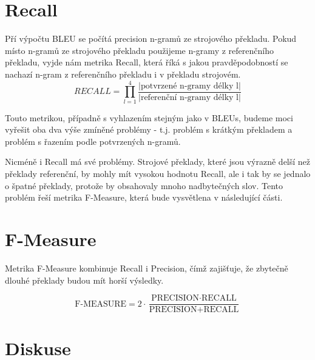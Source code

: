 \section{Recall}
Pří výpočtu BLEU se počítá precision n-gramů ze strojového překladu.
Pokud místo n-gramů ze strojového překladu použijeme n-gramy z referenčního překladu,
  vyjde nám metrika Recall,
  která říká s jakou pravděpodobností se nachazí n-gram z referenčního překladu i v překladu strojovém.
$$ RECALL = \prod_{l=1}^{4} \frac{ \lvert \text{potvrzené n-gramy délky l} \rvert }{ \lvert \text{referenční n-gramy délky l} \rvert } $$

Touto metrikou, případně s vyhlazením stejným jako v BLEUs,
  budeme moci vyřešit oba dva výše zmíněné problémy - 
  t.j. problém s krátkým překladem a problém s řazením podle potvrzených n-gramů.

Nicméně i Recall má své problémy.
Strojové překlady,
  které jsou výrazně delší než překlady referenční,
  by mohly mít vysokou hodnotu Recall,
  ale i tak by se jednalo o špatné překlady,
  protože by obsahovaly mnoho nadbytečných slov. 
Tento problém řeší metrika F-Measure,
  která bude vysvětlena v následující části.

\section{F-Measure}
Metrika F-Measure kombinuje Recall i Precision,
  čímž zajišťuje, 
  že zbytečně dlouhé překlady budou mít horší výsledky.

$$ \text{F-MEASURE} = 2 \cdot \frac{\text{PRECISION} \cdot \text{RECALL}}{\text{PRECISION} + \text{RECALL}} $$

\section{Diskuse}
